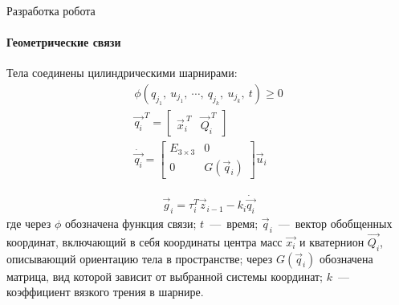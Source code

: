 \documentclass[aspectratio=169,xcolor=table]{beamer}
\begin{document}
\begin{frame}[t]{Разработка робота}
    \framesubtitle{Геометрические связи}
    \vspace{-0.5cm}
    Тела соединены цилиндрическими шарнирами:
    \begin{align*}
        \label{eq:kin_constr}
        \phi(q_{j_1},\ u_{j_1},\ \cdots,\ q_{j_k},\ u_{j_k},\ t) \geqslant  0 \\
        \vec{q_i}^{\ T} = \begin{bmatrix}
                              \vec{x}_i^{\ T} & \vec{Q}_i^{\ T}
                          \end{bmatrix}                   \\
        \dot{\vec{q_i}} = \begin{bmatrix}
                              E_{3\times3} & 0            \\
                              0            & G(\vec{q}_i)
                          \end{bmatrix}\vec{u}_i
    \end{align*}

    \begin{align*}
        \vec{g}_i = \tau_i^T \vec{z}_{i-1} -k_i \dot{\vec{q_i}}
    \end{align*}
    где через $\phi$ обозначена функция связи; $t$~---~время; $\vec{q}_{i}$~---~вектор обобщенных координат, включающий в себя координаты центра масс $\vec{x_i}$ и кватернион $\vec{Q_i}$, описывающий ориентацию тела в пространстве; через $G(\vec{q}_i)$ обозначена матрица, вид которой зависит от выбранной системы координат; $k$~---~ коэффициент вязкого трения в шарнире.
\end{frame}
\end{document}
